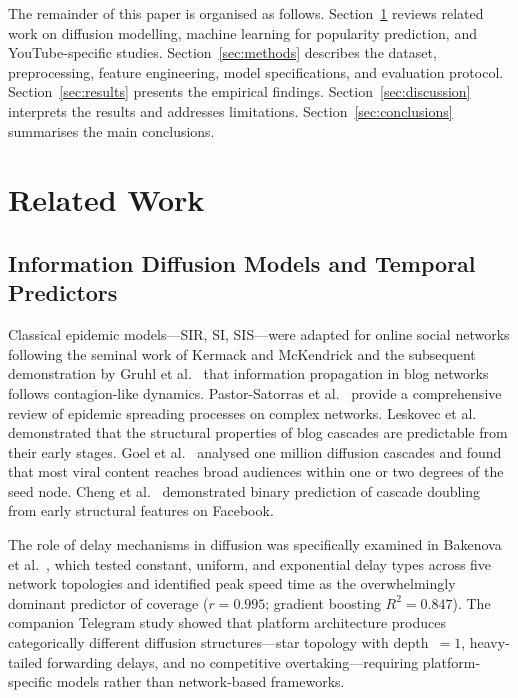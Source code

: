 \documentclass[journal,article,submit,pdftex,moreauthors]{Definitions/mdpi}
\begin{document}
The remainder of this paper is organised as follows.
Section~\ref{sec:related} reviews related work on diffusion modelling,
machine learning for popularity prediction, and YouTube-specific studies.
Section~\ref{sec:methods} describes the dataset, preprocessing, feature
engineering, model specifications, and evaluation protocol.
Section~\ref{sec:results} presents the empirical findings.
Section~\ref{sec:discussion} interprets the results and addresses
limitations.
Section~\ref{sec:conclusions} summarises the main conclusions.

\section{Related Work}
\label{sec:related}

\subsection{Information Diffusion Models and Temporal Predictors}

Classical epidemic models---SIR, SI, SIS---were adapted for online social
networks following the seminal work of Kermack and McKendrick
\cite{ref-kermack1927} and the subsequent demonstration by Gruhl et al.\
\cite{ref-gruhl2004} that information propagation in blog networks follows
contagion-like dynamics.
Pastor-Satorras et al.\ \cite{ref-pastor2015} provide a comprehensive
review of epidemic spreading processes on complex networks.
Leskovec et al.\ \cite{ref-leskovec2007} demonstrated that the structural
properties of blog cascades are predictable from their early stages.
Goel et al.\ \cite{ref-goel2016} analysed one million diffusion cascades
and found that most viral content reaches broad audiences within one or two
degrees of the seed node.
Cheng et al.\ \cite{ref-cheng2014} demonstrated binary prediction of cascade
doubling from early structural features on Facebook.

The role of delay mechanisms in diffusion was specifically examined in
Bakenova et al.\ \cite{ref-paper1}, which tested constant, uniform, and
exponential delay types across five network topologies and identified
peak speed time as the overwhelmingly dominant predictor of coverage
($r = 0.995$; gradient boosting $R^2 = 0.847$).
The companion Telegram study \cite{ref-paper2} showed that platform
architecture produces categorically different diffusion structures---star
topology with depth~$= 1$, heavy-tailed forwarding delays, and no
competitive overtaking---requiring platform-specific models rather than
network-based frameworks.
\end{document}
